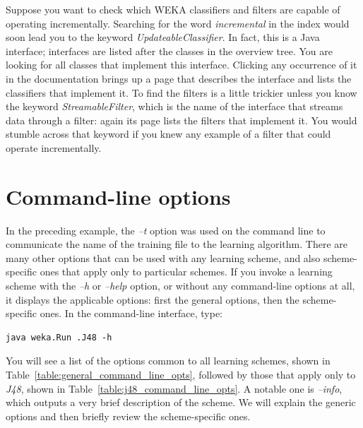 Suppose you want to check which WEKA classifiers and filters are
capable of operating incrementally. Searching for the word \textit{incremental}
in the index would soon lead you to the keyword
\textit{UpdateableClassifier}. In fact, this is a Java interface; interfaces
are listed after the classes in the overview tree. You are looking for
all classes that implement this interface. Clicking any occurrence of
it in the documentation brings up a page that describes the interface
and lists the classifiers that implement it. To find the filters is a
little trickier unless you know the keyword \textit{StreamableFilter}, which is
the name of the interface that streams data through a filter: again
its page lists the filters that implement it. You would stumble across
that keyword if you knew any example of a filter that could operate
incrementally.

\section{Command-line options}
\label{section:command_line_opts}

In the preceding example, the \textit{--t} option was used on the
command line to communicate the name of the training file to the
learning algorithm. There are many other options that can be used with
any learning scheme, and also scheme-specific ones that apply only to
particular schemes. If you invoke a learning scheme with the \textit{--h}
or \textit{--help} option, or without any command-line options at all,
it displays the applicable options: first the general options, then
the scheme-specific ones. In the command-line interface, type:

\begin{Verbatim}[fontsize=\footnotesize]
java weka.Run .J48 -h
\end{Verbatim}

\noindent You will see a list of the options common to all learning schemes, 
shown in Table~\ref{table:general_command_line_opts}, followed by
those that apply only to \textit{J48}, shown in
Table~\ref{table:j48_command_line_opts}. A notable one
is \textit{--info}, which outputs a very brief description of the
scheme. We will explain the generic options and then briefly review
the scheme-specific ones.

